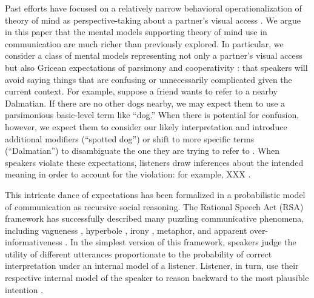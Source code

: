 \documentclass[manuscript]{stjour}
\begin{document}
Past efforts have focused on a relatively narrow behavioral operationalization of theory of mind as perspective-taking about a partner's visual access \cite{KeysarBarr___Brauner00_TakingPerspective, KeysarLinBarr03_LimitsOnTheoryOfMindUse, LinKeysarEpley10_ReflexivelyMindblind}. 
We argue in this paper that the mental models supporting theory of mind use in communication are much richer than previously explored. 
In particular, we consider a class of mental models representing not only a partner's visual access but also Gricean expectations of parsimony and cooperativity \cite{Grice75_LogicConversation}: that speakers will avoid saying things that are confusing or unnecessarily complicated given the current context. 
For example, suppose a friend wants to refer to a nearby Dalmatian. 
If there are no other dogs nearby, we may expect them to use a parsimonious basic-level term like ``dog.''
When there is potential for confusion, however, we expect them to consider our likely interpretation and introduce additional modifiers (``spotted dog'') or shift to more specific terms (``Dalmatian'') to disambiguate the one they are trying to refer to \cite{BrennanClark96_ConceptualPactsConversation, VanDeemter16_ComputationalModelsOfReferring, GrafEtAl16_BasicLevel}. 
When speakers violate these expectations, listeners draw inferences about the intended meaning in order to account for the violation: for example, XXX \cite{XXX, BrehenyKatsosWilliams06_ImplicaturesOnline, StillerGoodmanFrank15_AdHocImplicature}. 

This intricate dance of expectations has been formalized in a probabilistic model of communication as recursive social reasoning. The Rational Speech Act (RSA) framework has successfully described many puzzling communicative phenomena, including vagueness \cite{Lassiter}, hyperbole \cite{Kao}, irony \cite{}, metaphor, and apparent over-informativeness \cite{Judith}. In the simplest version of this framework, speakers judge the utility of different utterances proportionate to the probability of correct interpretation under an internal model of a listener. Listener, in turn, use their respective internal model of the speaker to reason backward to the most plausible intention \cite{Grice75_LogicConversation,Clark96_UsingLanguage,GoodmanFrank16_RSATiCSFrankGoodman12_PragmaticReasoningLanguageGames, GoodmanStuhlmuller13_KnowledgeImplicature}. 
\end{document}
